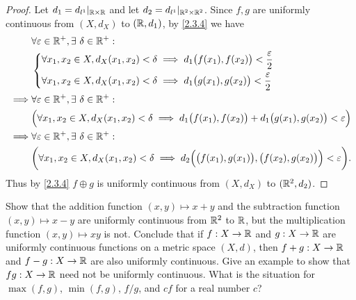 \begin{proof}
  Let \(d_1 = d_{l^1}|_{\mathbb{R} \times \mathbb{R}}\) and let \(d_2 = d_{l^1}|_{\mathbb{R}^2 \times \mathbb{R}^2}\).
  Since \(f, g\) are uniformly continuous from \((X, d_X)\) to \((\mathbb{R}, d_1)\), by \cref{2.3.4} we have
  \begin{align*}
             & \forall \varepsilon \in \mathbb{R}^+, \exists\ \delta \in \mathbb{R}^+ :                                                                                           \\
             & \begin{dcases}
                 \forall x_1, x_2 \in X, d_X(x_1, x_2) < \delta \implies d_1\big(f(x_1), f(x_2)\big) < \dfrac{\varepsilon}{2} \\
                 \forall x_1, x_2 \in X, d_X(x_1, x_2) < \delta \implies d_1\big(g(x_1), g(x_2)\big) < \dfrac{\varepsilon}{2}
               \end{dcases}                                       \\
    \implies & \forall \varepsilon \in \mathbb{R}^+, \exists\ \delta \in \mathbb{R}^+ :                                                                                           \\
             & \Big(\forall x_1, x_2 \in X, d_X(x_1, x_2) < \delta \implies d_1\big(f(x_1), f(x_2)\big) + d_1\big(g(x_1), g(x_2)\big) < \varepsilon\Big)          \\
    \implies & \forall \varepsilon \in \mathbb{R}^+, \exists\ \delta \in \mathbb{R}^+ :                                                                                           \\
             & \bigg(\forall x_1, x_2 \in X, d_X(x_1, x_2) < \delta \implies d_2\Big(\big(f(x_1), g(x_1)\big), \big(f(x_2), g(x_2)\big)\Big) < \varepsilon\bigg).
  \end{align*}
  Thus by \cref{2.3.4} \(f \oplus g\) is uniformly continuous from \((X, d_X)\) to \((\mathbb{R}^2, d_2)\).
\end{proof}

\begin{ex}\label{ex:2.3.6}
  Show that the addition function \((x, y) \mapsto x + y\) and the subtraction function \((x, y) \mapsto x - y\) are uniformly continuous from \(\mathbb{R}^2\) to \(\mathbb{R}\), but the multiplication function \((x, y) \mapsto xy\) is not.
  Conclude that if \(f : X \to \mathbb{R}\) and \(g : X \to \mathbb{R}\) are uniformly continuous functions on a metric space \((X, d)\), then \(f + g : X \to \mathbb{R}\) and \(f - g : X \to \mathbb{R}\) are also uniformly continuous.
  Give an example to show that \(fg : X \to \mathbb{R}\) need not be uniformly continuous.
  What is the situation for \(\max(f, g)\), \(\min(f, g)\), \(f / g\), and \(cf\) for a real number \(c\)?
\end{ex}


